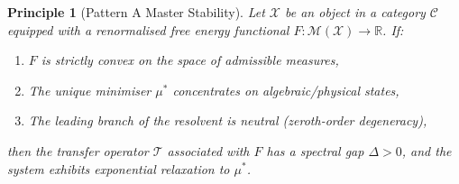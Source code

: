 \documentclass[12pt,a4paper]{article}
\newtheorem{principle}[theorem]{Principle}
\theoremstyle{definition}
\theoremstyle{remark}
\begin{document}
\begin{principle}[Pattern A Master Stability]
\label{princ:master-stability}
Let $\mathcal{X}$ be an object in a category $\mathcal{C}$ equipped with a renormalised free energy functional $F: \mathcal{M}(\mathcal{X}) \to \mathbb{R}$. If:
\begin{enumerate}
\item $F$ is strictly convex on the space of admissible measures,
\item The unique minimiser $\mu^*$ concentrates on algebraic/physical states,
\item The leading branch of the resolvent is neutral (zeroth-order degeneracy),
\end{enumerate}
then the transfer operator $\mathcal{T}$ associated with $F$ has a spectral gap $\Delta > 0$, and the system exhibits exponential relaxation to $\mu^*$.
\end{principle}
\end{document}
